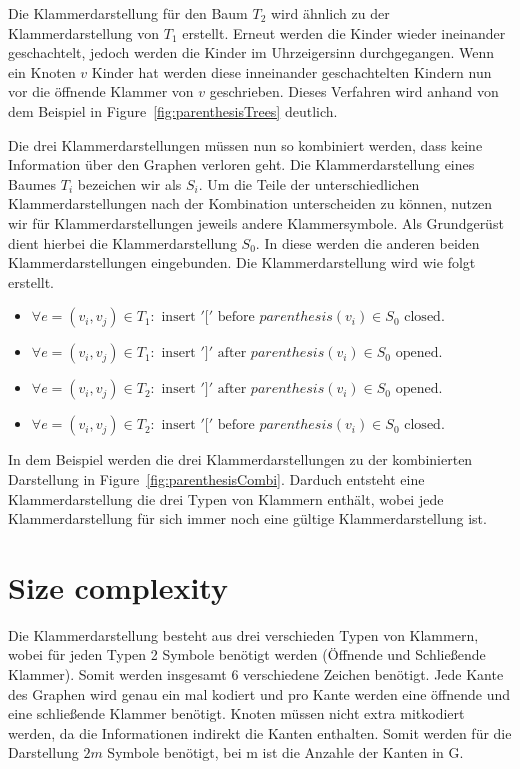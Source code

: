 \documentclass[a4paper]{scrartcl}
\begin{document}
Die Klammerdarstellung für den Baum $T_2$ wird ähnlich zu der Klammerdarstellung von $T_1$ erstellt. Erneut werden die Kinder wieder ineinander geschachtelt, jedoch werden die Kinder im Uhrzeigersinn durchgegangen. Wenn ein Knoten $v$ Kinder hat werden diese inneinander geschachtelten Kindern nun vor die öffnende Klammer von $v$ geschrieben. Dieses Verfahren wird anhand von dem Beispiel in Figure~\ref{fig:parenthesisTrees} deutlich.




Die drei Klammerdarstellungen  müssen nun so kombiniert werden, dass keine Information über den Graphen verloren geht. Die Klammerdarstellung eines Baumes $T_i$ bezeichen wir als $S_i$. Um die Teile der  unterschiedlichen Klammerdarstellungen nach der Kombination unterscheiden zu können, nutzen wir für Klammerdarstellungen jeweils andere Klammersymbole. Als Grundgerüst dient hierbei die Klammerdarstellung $S_0$. In diese werden die anderen beiden Klammerdarstellungen eingebunden. Die Klammerdarstellung wird wie folgt erstellt.

\begin{itemize}
	\item $\forall e=(v_i,v_j)\in T_1: \text{ insert } '[' \text{ before } parenthesis(v_i)\in S_0 \text{ closed.}$
	\item $\forall e=(v_i,v_j)\in T_1: \text{ insert } ']' \text{ after } parenthesis(v_i)\in S_0 \text{ opened.}$
	\item $\forall e=(v_i,v_j)\in T_2: \text{ insert } ']' \text{ after } parenthesis(v_i)\in S_0 \text{ opened.}$
	\item $\forall e=(v_i,v_j)\in T_2: \text{ insert } '[' \text{ before } parenthesis(v_i)\in S_0 \text{ closed.}$
\end{itemize}
In dem Beispiel werden die drei Klammerdarstellungen zu der kombinierten Darstellung in Figure~\ref{fig:parenthesisCombi}.
Darduch entsteht eine Klammerdarstellung die drei Typen von Klammern enthält, wobei jede Klammerdarstellung für sich immer noch eine gültige Klammerdarstellung ist.

\section{Size complexity}


Die Klammerdarstellung besteht aus drei verschieden Typen von Klammern, wobei für jeden Typen 2 Symbole benötigt werden (Öffnende und Schließende Klammer). Somit werden insgesamt 6 verschiedene Zeichen benötigt. Jede Kante des Graphen wird genau ein mal kodiert und pro Kante werden eine öffnende und eine schließende Klammer benötigt. Knoten müssen nicht extra mitkodiert werden, da die Informationen indirekt  die Kanten enthalten. Somit werden für die Darstellung $2m$ Symbole benötigt, bei m ist die Anzahle der Kanten in G.
\end{document}
